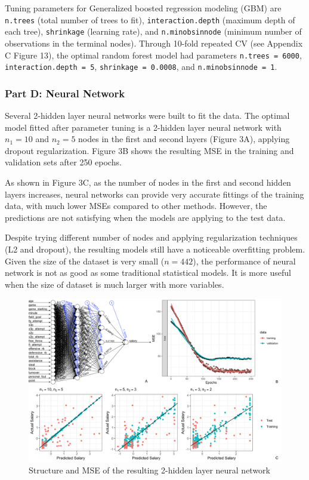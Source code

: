 \documentclass[
]{article}
\begin{document}
Tuning parameters for Generalized boosted regression modeling (GBM) are
\texttt{n.trees} (total number of trees to fit),
\texttt{interaction.depth} (maximum depth of each tree),
\texttt{shrinkage} (learning rate), and \texttt{n.minobsinnode} (minimum
number of observations in the terminal nodes). Through 10-fold repeated
CV (see Appendix C Figure 13), the optimal random forest model had
parameters \texttt{n.trees\ =\ 6000}, \texttt{interaction.depth\ =\ 5},
\texttt{shrinkage\ =\ 0.0008}, and \texttt{n.minobsinnode\ =\ 1}.

\hypertarget{part-d-neural-network}{%
\subsubsection{Part D: Neural Network}\label{part-d-neural-network}}

Several 2-hidden layer neural networks were built to fit the data. The
optimal model fitted after parameter tuning is a 2-hidden layer neural
network with \(n_1 = 10\) and \(n_2 = 5\) nodes in the first and second
layers (Figure 3A), applying dropout regularization. Figure 3B shows the
resulting MSE in the training and validation sets after 250 epochs.

As shown in Figure 3C, as the number of nodes in the first and second
hidden layers increases, neural networks can provide very accurate
fittings of the training data, with much lower MSEs compared to other
methods. However, the predictions are not satisfying when the models are
applying to the test data.

Despite trying different number of nodes and applying regularization
techniques (L2 and dropout), the resulting models still have a
noticeable overfitting problem. Given the size of the dataset is very
small (\(n=442\)), the performance of neural network is not as good as
some traditional statistical models. It is more useful when the size of
dataset is much larger with more variables.

\begin{figure}
\centering
\includegraphics{report_figures/figure_nn.png}
\caption{Structure and MSE of the resulting 2-hidden layer neural
network}
\end{figure}
\end{document}
